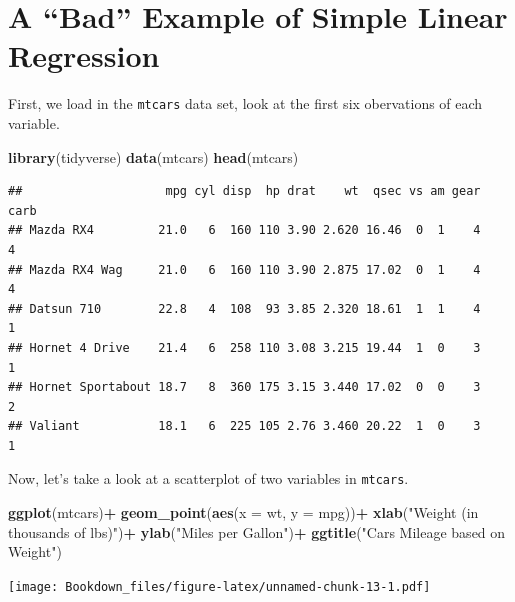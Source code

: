 \documentclass[
]{book}
\newenvironment{Shaded}{\begin{snugshade}}{\end{snugshade}}
\newcommand{\DataTypeTok}[1]{\textcolor[rgb]{0.13,0.29,0.53}{#1}}
\newcommand{\KeywordTok}[1]{\textcolor[rgb]{0.13,0.29,0.53}{\textbf{#1}}}
\newcommand{\NormalTok}[1]{#1}
\newcommand{\OperatorTok}[1]{\textcolor[rgb]{0.81,0.36,0.00}{\textbf{#1}}}
\newcommand{\StringTok}[1]{\textcolor[rgb]{0.31,0.60,0.02}{#1}}
\begin{document}
\hypertarget{a-bad-example-of-simple-linear-regression}{%
\section{A ``Bad'' Example of Simple Linear Regression}\label{a-bad-example-of-simple-linear-regression}}

First, we load in the \texttt{mtcars} data set, look at the first six obervations of each variable.

\begin{Shaded}
\begin{Highlighting}[]
\KeywordTok{library}\NormalTok{(tidyverse)}
\KeywordTok{data}\NormalTok{(mtcars)}
\KeywordTok{head}\NormalTok{(mtcars)}
\end{Highlighting}
\end{Shaded}

\begin{verbatim}
##                    mpg cyl disp  hp drat    wt  qsec vs am gear carb
## Mazda RX4         21.0   6  160 110 3.90 2.620 16.46  0  1    4    4
## Mazda RX4 Wag     21.0   6  160 110 3.90 2.875 17.02  0  1    4    4
## Datsun 710        22.8   4  108  93 3.85 2.320 18.61  1  1    4    1
## Hornet 4 Drive    21.4   6  258 110 3.08 3.215 19.44  1  0    3    1
## Hornet Sportabout 18.7   8  360 175 3.15 3.440 17.02  0  0    3    2
## Valiant           18.1   6  225 105 2.76 3.460 20.22  1  0    3    1
\end{verbatim}

Now, let's take a look at a scatterplot of two variables in \texttt{mtcars}.

\begin{Shaded}
\begin{Highlighting}[]
\KeywordTok{ggplot}\NormalTok{(mtcars)}\OperatorTok{+}
\StringTok{  }\KeywordTok{geom\_point}\NormalTok{(}\KeywordTok{aes}\NormalTok{(}\DataTypeTok{x =}\NormalTok{ wt, }\DataTypeTok{y =}\NormalTok{ mpg))}\OperatorTok{+}
\StringTok{  }\KeywordTok{xlab}\NormalTok{(}\StringTok{"Weight (in thousands of lbs)"}\NormalTok{)}\OperatorTok{+}
\StringTok{  }\KeywordTok{ylab}\NormalTok{(}\StringTok{"Miles per Gallon"}\NormalTok{)}\OperatorTok{+}
\StringTok{  }\KeywordTok{ggtitle}\NormalTok{(}\StringTok{"Car\textquotesingle{}s Mileage based on Weight"}\NormalTok{)}
\end{Highlighting}
\end{Shaded}

\texttt{[image: Bookdown\_files/figure-latex/unnamed-chunk-13-1.pdf]}
\end{document}
